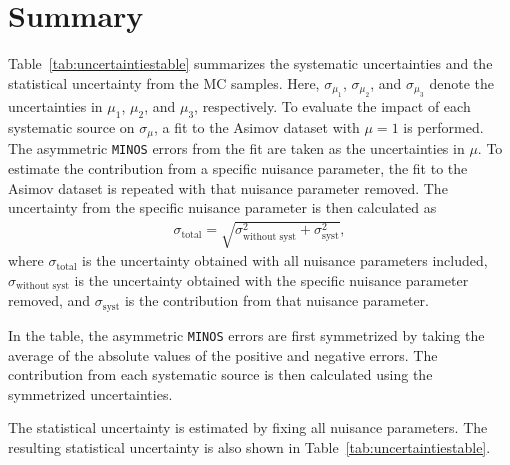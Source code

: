 \section{Summary}
Table~\ref{tab:uncertaintiestable} summarizes the systematic uncertainties
and the statistical uncertainty from the MC samples.
Here, $\sigma_{\mu_{1}}$, $\sigma_{\mu_{2}}$, and $\sigma_{\mu_{3}}$ denote the uncertainties in $\mu_{1}$, $\mu_{2}$, and $\mu_{3}$, respectively.
To evaluate the impact of each systematic source on $\sigma_{\mu}$, a fit to the Asimov dataset with $\mu=1$ is performed.
The asymmetric \texttt{MINOS} errors from the fit are taken as the uncertainties in $\mu$.
To estimate the contribution from a specific nuisance parameter, the fit to the Asimov dataset is repeated with that nuisance parameter removed.
The uncertainty from the specific nuisance parameter is then calculated as
\begin{align}
    \label{eq:syst_break}
    \sigma_{\textrm{total}} = \sqrt{\sigma_{\textrm{without syst}}^{2} + \sigma_{\textrm{syst}}^{2}},
\end{align}
where $\sigma_{\textrm{total}}$ is the uncertainty obtained with all nuisance parameters included, $\sigma_{\textrm{without syst}}$ is the uncertainty obtained with the specific nuisance parameter removed, and $\sigma_{\textrm{syst}}$ is the contribution from that nuisance parameter.

In the table, the asymmetric \texttt{MINOS} errors are first symmetrized by taking the average of the absolute values of the positive and negative errors.
The contribution from each systematic source is then calculated using the symmetrized uncertainties.

The statistical uncertainty is estimated by fixing all nuisance parameters.
The resulting statistical uncertainty is also shown in Table~\ref{tab:uncertaintiestable}.

